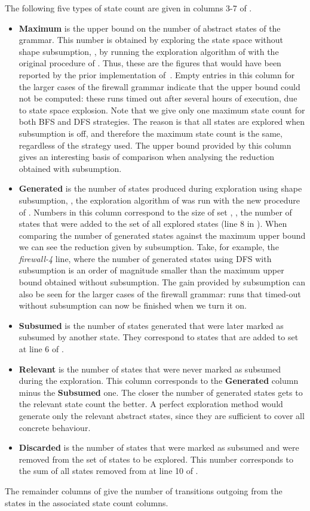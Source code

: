 The following five types of state count are given in columns 3-7 of
.
\begin{itemize}
\item {\bf Maximum} is the upper bound on the number of abstract states of the
grammar. This number is obtained by exploring the state space without shape
subsumption, \ie, by running the exploration algorithm of 
with the original  procedure of . Thus, these are the
figures that would have been reported by the prior implementation
of~\cite{RZ10}. Empty entries in
this column for the larger cases of the firewall grammar indicate that the
upper bound could not be computed: these runs timed out after several hours of
execution, due to state space explosion. Note that we give only one maximum
state count for both BFS and DFS strategies. The reason is that all states are
explored when subsumption is off, and therefore the maximum state count is
the same, regardless of the strategy used. The upper bound provided by this
column gives an interesting basis of comparison when analysing the reduction
obtained with subsumption.
\item {\bf Generated} is the number of states produced during exploration using
shape subsumption, \ie, the exploration algorithm of  was run 
with the new  procedure of . Numbers in this
column correspond to the size of set , \ie, the number of states that were
added to the set of all explored states (line 8 in ). When
comparing the number of generated states against the maximum upper bound we can
see the reduction given by subsumption. Take, for example, the
\emph{firewall-4} line, where the number of generated states using DFS with
subsumption is an order of magnitude smaller than the maximum upper bound
obtained without subsumption. The gain provided by subsumption can also be seen
for the larger cases of the firewall grammar: runs that timed-out without
subsumption can now be finished when we turn it on.
\item {\bf Subsumed} is the number of states generated that were later marked
as subsumed by another state. They correspond to states that are added to set
 at line 6 of .
\item {\bf Relevant} is the number of states that were never marked as subsumed
during the exploration. This column corresponds to the {\bf Generated} column
minus the {\bf Subsumed} one. The closer the number of generated states gets to
the relevant state count the better. A perfect exploration method would generate
only the relevant abstract states, since they are sufficient to cover all
concrete behaviour.
\item {\bf Discarded} is the number of states that were marked as subsumed and
were removed from the set of states to be explored. This number corresponds to
the sum of all states removed from  at line 10 of .
\end{itemize}
The remainder columns of  give the number of transitions outgoing
from the states in the associated state count columns.

